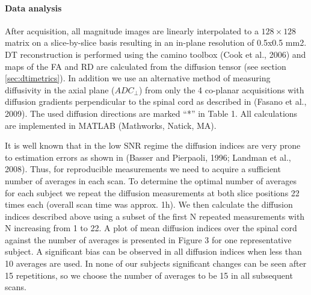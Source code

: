 \paragraph{Data analysis} After acquisition, all magnitude images are linearly interpolated to a $128\times128$ matrix on a slice-by-slice basis resulting in an in-plane resolution of 0.5x0.5 mm2. DT reconstruction is performed using the camino toolbox (Cook et al., 2006) and maps of the FA and RD are calculated from the diffusion tensor (see section \ref{sec:dtimetrics}). In addition we use an alternative method of measuring diffusivity in the axial plane ($ADC_\perp$) from only the 4 co-planar acquisitions with diffusion gradients perpendicular to the spinal cord as described in (Fasano et al., 2009). The used diffusion directions are marked “*” in Table 1. All calculations are implemented in MATLAB (Mathworks, Natick, MA).

It is well known that in the low SNR regime the diffusion indices are very prone to estimation errors as shown in (Basser and Pierpaoli, 1996; Landman et al., 2008). Thus, for reproducible measurements we need to acquire a sufficient number of averages in each scan. To determine the optimal number of averages for each subject we repeat the diffusion measurements at both slice positions 22 times each (overall scan time was approx. 1h). We then calculate the diffusion indices described above using a subset of the first N repeated measurements with N increasing from 1 to 22. A plot of mean diffusion indices over the spinal cord against the number of averages is presented in Figure 3 for one representative subject. A significant bias can be observed in all diffusion indices when less than 10 averages are used. In none of our subjects significant changes can be seen after 15 repetitions, so we choose the number of averages to be 15 in all subsequent scans.

